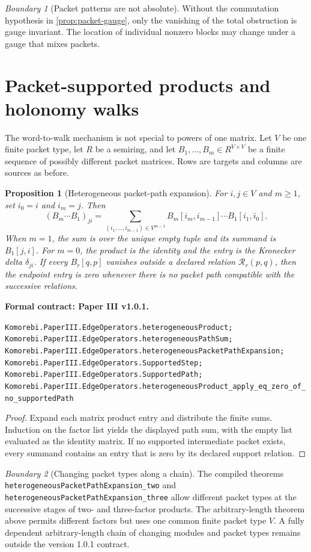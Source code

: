 \documentclass[11pt,a4paper]{article}
\theoremstyle{plain}
\newtheorem{proposition}[proposition]{Proposition}
\theoremstyle{definition}
\theoremstyle{remark}
\newtheorem{boundary}[boundary]{Boundary}
\newcommand{\leanname}[1]{\nolinkurl{#1}}
\newcommand{\statusleanthree}[1]{\par\smallskip\noindent\begin{minipage}{\linewidth}{\color{leanblue}\textbf{Formal contract: Paper III v1.0.1.}}\par\begingroup\small\raggedright\leanname{#1}\par\endgroup\end{minipage}\par\smallskip}
\begin{document}
\begin{boundary}[Packet patterns are not absolute]
Without the commutation hypothesis in \cref{prop:packet-gauge}, only the
vanishing of the total obstruction is gauge invariant.  The location of
individual nonzero blocks may change under a gauge that mixes packets.
\end{boundary}

\section{Packet-supported products and holonomy walks}
\label{sec:holonomy-walks}

The word-to-walk mechanism is not special to powers of one matrix.  Let $V$
be one finite packet type, let $R$ be a semiring, and let
$B_1,\ldots,B_m\in R^{V\times V}$ be a finite sequence of possibly different
packet matrices.  Rows are targets and columns are sources as before.

\begin{proposition}[Heterogeneous packet-path expansion]
\label{prop:heterogeneous-path}
For $i,j\in V$ and $m\geq1$, set $i_0=i$ and $i_m=j$.  Then
\[
\boxed{
(B_m\cdots B_1)_{ji}
=
\sum_{(i_1,\ldots,i_{m-1})\in V^{m-1}}
  B_m[i_m,i_{m-1}]\cdots B_1[i_1,i_0].
}
\]
When $m=1$, the sum is over the unique empty tuple and its summand is
$B_1[j,i]$.
For $m=0$, the product is the identity and the entry is the Kronecker delta
$\delta_{ji}$.  If every $B_r[q,p]$ vanishes outside a declared relation
$\mathcal R_r(p,q)$, then the endpoint entry is zero whenever there is no
packet path compatible with the successive relations.
\end{proposition}
\statusleanthree{Komorebi.PaperIII.EdgeOperators.heterogeneousProduct; Komorebi.PaperIII.EdgeOperators.heterogeneousPathSum; Komorebi.PaperIII.EdgeOperators.heterogeneousPacketPathExpansion; Komorebi.PaperIII.EdgeOperators.SupportedStep; Komorebi.PaperIII.EdgeOperators.SupportedPath; Komorebi.PaperIII.EdgeOperators.heterogeneousProduct_apply_eq_zero_of_no_supportedPath}

\begin{proof}
Expand each matrix product entry and distribute the finite sums.  Induction on
the factor list yields the displayed path sum, with the empty list evaluated
as the identity matrix.  If no supported intermediate packet exists, every
summand contains an entry that is zero by its declared support relation.
\end{proof}

\begin{boundary}[Changing packet types along a chain]
The compiled theorems
\leanname{heterogeneousPacketPathExpansion_two} and
\leanname{heterogeneousPacketPathExpansion_three} allow different packet
types at the successive stages of two- and three-factor products.  The
arbitrary-length theorem above permits different factors but uses one common
finite packet type $V$.  A fully dependent arbitrary-length chain of changing
modules and packet types remains outside the version 1.0.1 contract.
\end{boundary}
\end{document}
